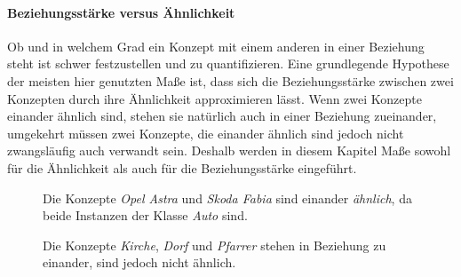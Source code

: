 \paragraph{Beziehungsstärke versus Ähnlichkeit}
Ob und in welchem Grad ein Konzept mit einem anderen in einer Beziehung steht ist schwer festzustellen und zu quantifizieren.
Eine grundlegende Hypothese der meisten hier genutzten Maße ist, dass sich die Beziehungsstärke zwischen zwei Konzepten durch ihre Ähnlichkeit approximieren lässt.
Wenn zwei Konzepte einander ähnlich sind, stehen sie natürlich auch in einer Beziehung zueinander, umgekehrt müssen zwei Konzepte, die einander ähnlich sind jedoch nicht zwangsläufig auch verwandt sein.
Deshalb werden in diesem Kapitel Maße sowohl für die Ähnlichkeit als auch für die Beziehungsstärke eingeführt.
\begin{figure}[h]
\begin{center}%
\end{center}
\caption{Die Konzepte \emph{Opel Astra} und \emph{Skoda Fabia} sind einander \emph{ähnlich}, da beide Instanzen der Klasse \emph{Auto} sind.}
\label{fig:disambiguierung_aehnlichkeit}
\end{figure}

\begin{figure}[h]
\begin{center}%
\end{center}
\caption{Die Konzepte \emph{Kirche}, \emph{Dorf} und \emph{Pfarrer} stehen in Beziehung zu einander, sind jedoch nicht ähnlich.}
\label{fig:disambiguierung_beziehungsstaerke}
\end{figure}

\FloatBarrier

